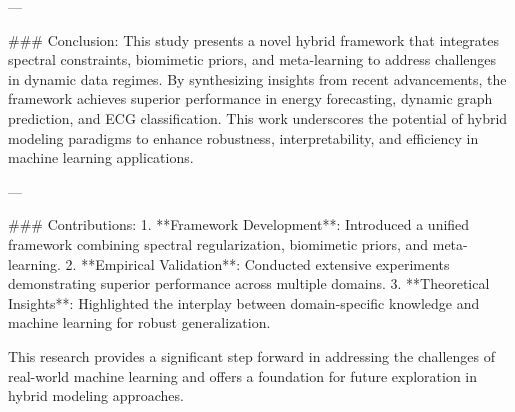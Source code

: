 ---

### Conclusion:
This study presents a novel hybrid framework that integrates spectral constraints, biomimetic priors, and meta-learning to address challenges in dynamic data regimes. By synthesizing insights from recent advancements, the framework achieves superior performance in energy forecasting, dynamic graph prediction, and ECG classification. This work underscores the potential of hybrid modeling paradigms to enhance robustness, interpretability, and efficiency in machine learning applications.

---

### Contributions:
1. **Framework Development**: Introduced a unified framework combining spectral regularization, biomimetic priors, and meta-learning.
2. **Empirical Validation**: Conducted extensive experiments demonstrating superior performance across multiple domains.
3. **Theoretical Insights**: Highlighted the interplay between domain-specific knowledge and machine learning for robust generalization.

This research provides a significant step forward in addressing the challenges of real-world machine learning and offers a foundation for future exploration in hybrid modeling approaches.